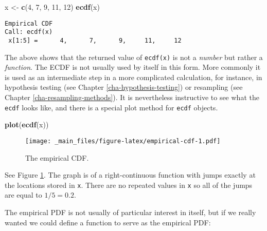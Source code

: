 \documentclass[]{book}
\newenvironment{Shaded}{\begin{snugshade}}{\end{snugshade}}
\newcommand{\KeywordTok}[1]{\textcolor[rgb]{0.13,0.29,0.53}{\textbf{{#1}}}}
\newcommand{\DecValTok}[1]{\textcolor[rgb]{0.00,0.00,0.81}{{#1}}}
\newcommand{\StringTok}[1]{\textcolor[rgb]{0.31,0.60,0.02}{{#1}}}
\newcommand{\CommentTok}[1]{\textcolor[rgb]{0.56,0.35,0.01}{\textit{{#1}}}}
\newcommand{\NormalTok}[1]{{#1}}
\numberwithin{equation}{chapter}
\numberwithin{figure}{chapter}
\theoremstyle{plain}
\theoremstyle{definition}
\theoremstyle{remark}
\theoremstyle{definition}
\theoremstyle{definition}
\theoremstyle{remark}
\begin{document}
\begin{Shaded}
\begin{Highlighting}[]
\NormalTok{x <-}\StringTok{ }\KeywordTok{c}\NormalTok{(}\DecValTok{4}\NormalTok{, }\DecValTok{7}\NormalTok{, }\DecValTok{9}\NormalTok{, }\DecValTok{11}\NormalTok{, }\DecValTok{12}\NormalTok{)}
\KeywordTok{ecdf}\NormalTok{(x)}
\end{Highlighting}
\end{Shaded}

\begin{verbatim}
Empirical CDF 
Call: ecdf(x)
 x[1:5] =      4,      7,      9,     11,     12
\end{verbatim}

The above shows that the returned value of \texttt{ecdf(x)} is not a
\emph{number} but rather a \emph{function}. The ECDF is not usually used
by itself in this form. More commonly it is used as an intermediate step
in a more complicated calculation, for instance, in hypothesis testing
(see Chapter \ref{cha-hypothesis-testing}) or resampling (see Chapter
\ref{cha-resampling-methods}). It is nevertheless instructive to see
what the \texttt{ecdf} looks like, and there is a special plot method
for \texttt{ecdf} objects.

\begin{Shaded}
\begin{Highlighting}[]
\KeywordTok{plot}\NormalTok{(}\KeywordTok{ecdf}\NormalTok{(x))}
\end{Highlighting}
\end{Shaded}

\begin{figure}[htbp]
\centering
\texttt{[image: \_main\_files/figure-latex/empirical-cdf-1.pdf]}
\caption{\label{fig:empirical-cdf}\small The empirical CDF.}
\end{figure}



See Figure \ref{fig:empirical-cdf}. The graph is of a right-continuous
function with jumps exactly at the locations stored in \texttt{x}. There
are no repeated values in \texttt{x} so all of the jumps are equal to
\(1/5=0.2\).

The empirical PDF is not usually of particular interest in itself, but
if we really wanted we could define a function to serve as the empirical
PDF:

\begin{Shaded}
\end{Shaded}
\end{document}

